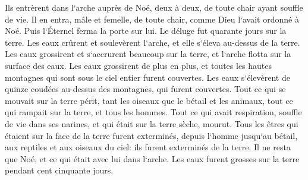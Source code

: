 \verse Ils entrèrent dans l`arche auprès de Noé, deux à deux, de toute chair ayant souffle de vie. 
\verse Il en entra, mâle et femelle, de toute chair, comme Dieu l`avait ordonné à Noé. Puis l`Éternel ferma la porte sur lui. 
\verse Le déluge fut quarante jours sur la terre. Les eaux crûrent et soulevèrent l`arche, et elle s`éleva au-dessus de la terre. 
\verse Les eaux grossirent et s`accrurent beaucoup sur la terre, et l`arche flotta sur la surface des eaux. 
\verse Les eaux grossirent de plus en plus, et toutes les hautes montagnes qui sont sous le ciel entier furent couvertes. 
\verse Les eaux s`élevèrent de quinze coudées au-dessus des montagnes, qui furent couvertes. 
\verse Tout ce qui se mouvait sur la terre périt, tant les oiseaux que le bétail et les animaux, tout ce qui rampait sur la terre, et tous les hommes. 
\verse Tout ce qui avait respiration, souffle de vie dans ses narines, et qui était sur la terre sèche, mourut. 
\verse Tous les êtres qui étaient sur la face de la terre furent exterminés, depuis l`homme jusqu`au bétail, aux reptiles et aux oiseaux du ciel: ils furent exterminés de la terre. Il ne resta que Noé, et ce qui était avec lui dans l`arche. 
\verse Les eaux furent grosses sur la terre pendant cent cinquante jours. 

